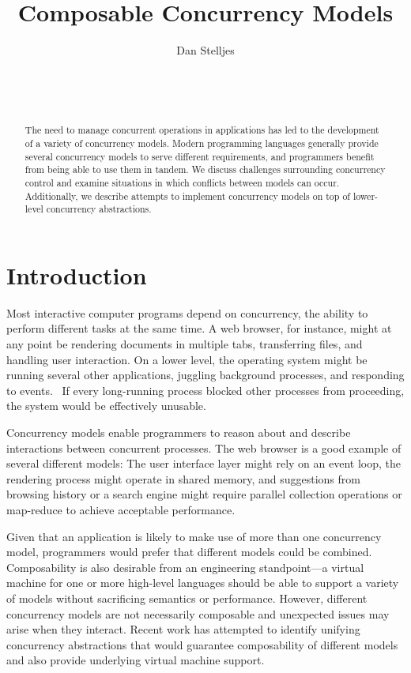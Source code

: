 \documentclass{sig-alternate}
\author{
\alignauthor{}
Dan Stelljes\\
  \affaddr{Division of Science and Mathematics}\\
  \affaddr{University of Minnesota, Morris}\\
  \affaddr{Morris, Minnesota, USA 56267}\\
  \email{stell124@morris.umn.edu}
}
\title{Composable Concurrency Models}
\begin{document}
\maketitle

\begin{abstract}

The need to manage concurrent operations in applications has led to the development of a variety of concurrency models. Modern programming languages generally provide several concurrency models to serve different requirements, and programmers benefit from being able to use them in tandem. We discuss challenges surrounding concurrency control and examine situations in which conflicts between models can occur. Additionally, we describe attempts to implement concurrency models on top of lower-level concurrency abstractions.

\end{abstract}


\section{Introduction}

Most interactive computer programs depend on concurrency, the ability to perform different tasks at the same time. A web browser, for instance, might at any point be rendering documents in multiple tabs, transferring files, and handling user interaction. On a lower level, the operating system might be running several other applications, juggling background processes, and responding to events.~\cite{Swalens2014} If every long-running process blocked other processes from proceeding, the system would be effectively unusable.

Concurrency models enable programmers to reason about and describe interactions between concurrent processes. The web browser is a good example of several different models: The user interface layer might rely on an event loop, the rendering process might operate in shared memory, and suggestions from browsing history or a search engine might require parallel collection operations or map-reduce to achieve acceptable performance.~\cite{Marr2012}

Given that an application is likely to make use of more than one concurrency model, programmers would prefer that different models could be combined. Composability is also desirable from an engineering standpoint---a virtual machine for one or more high-level languages should be able to support a variety of models without sacrificing semantics or performance. However, different concurrency models are not necessarily composable and unexpected issues may arise when they interact. Recent work has attempted to identify unifying concurrency abstractions that would guarantee composability of different models and also provide underlying virtual machine support.~\cite{Marr2009, Marr2012, Swalens2014, Ziv2015}
\end{document}

